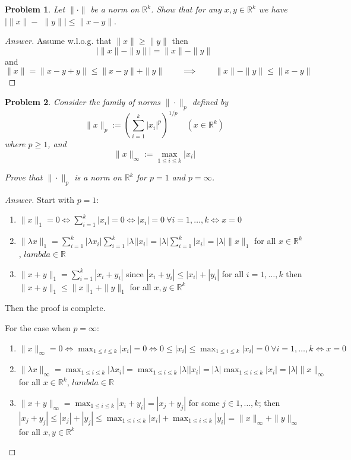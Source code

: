 \documentclass{article}
\newtheorem{problem}{Problem}[section]
\newcommand{\qiq}{\qquad \implies \qquad}
\begin{document}
\begin{problem}
    Let $\|\cdot\|$ be a norm on $\mathbb{R}^{k}$. Show that for any $x, y \in \mathbb{R}^{k}$ we have $\mid\|x\|-$ $\|y\| \mid \leq\|x-y\| .$
\end{problem}
\begin{proof}[Answer]
    Assume w.l.o.g. that $\|x\| \geq \|y\|$ then
    $$\big |\|x\|-\|y\|\big| = \|x\|-\|y\|$$
    and 
    $$\|x\| = \|x-y + y \| \leq \|x-y\| + \|y\| \qiq \|x\| - \|y\| \leq \|x-y\|$$
\end{proof}

\begin{problem}
    Consider the family of norms $\|\cdot\|_{p}$ defined by
$$
\|x\|_{p}:=\left(\sum_{i=1}^{k}\left|x_{i}\right|^{p}\right)^{1 / p} \quad\left(x \in \mathbb{R}^{k}\right)
$$
where $p \geq 1$, and 
$$\|x\|_{\infty}:=\max _{1 \leq i \leq k}\left|x_{i}\right|$$

Prove that $\|\cdot\|_{p}$ is a norm on $\mathbb{R}^{k}$ for $p=1$ and $p=\infty$.
\end{problem}
\begin{proof}[Answer]
    Start with $p=1$:
    \begin{enumerate}
        \item $\|x\|_1=0 \iff \sum_{i=1}^{k}\left|x_{i}\right| = 0 \iff |x_i| = 0 \: \forall i=1,\ldots,k \iff  x = 0$
        \item $\|\lambda x\|_1 = \sum_{i=1}^{k}\left|\lambda x_{i}\right| \sum_{i=1}^{k}|\lambda|\left|x_{i}\right| = |\lambda|\sum_{i=1}^{k}\left|x_{i}\right| = |\lambda| \|x\|_1$ for all $x\in \mathbb{R}^k$, $lambda\in \mathbb{R}$
        \item $\|x + y\|_1 = \sum_{i=1}^{k}\left|x_{i} + y_i\right|$ since $|x_i + y_i|\leq |x_i| + |y_i|$ for all $i=1,\ldots, k$ then $\|x + y\|_1\leq \|x \|_1 + \| y\|_1$ for all $x,y\in \mathbb{R}^k$
    \end{enumerate}
    Then the proof is complete.

    For the case when $p=\infty$:
    \begin{enumerate}
        \item $\|x\|_\infty=0 \iff \max _{1 \leq i \leq k}\left|x_{i}\right| = 0 \iff 0 \leq \left|x_{i}\right| \leq  \max _{1 \leq i \leq k}\left|x_{i}\right|  = 0 \:  \forall i=1,\ldots,k \iff  x = 0$ 
        \item $\|\lambda x\|_\infty = \max _{1 \leq i \leq k}\left|\lambda x_{i}\right| =\max _{1 \leq i \leq k}\left|\lambda| |x_{i}\right| = |\lambda| \max _{1 \leq i \leq k}\left|x_{i}\right| = |\lambda| \|x\|_\infty$ for all $x\in \mathbb{R}^k$, $lambda\in \mathbb{R}$
        \item $\| x + y\|_\infty = \max _{1 \leq i \leq k}\left|x_{i} + y_{i}\right|=\left|x_{j} + y_{j}\right|$ for some $j\in 1,\ldots , k$; then
              $\left|x_{j} + y_{j}\right| \leq |x_j| + |y_j| \leq \max _{1 \leq i \leq k}\left|x_{i}\right| + \max _{1 \leq i \leq k}\left|y_{i}\right| = \|x\|_\infty+\|y\|_\infty$  for all $x,y\in \mathbb{R}^k$
    \end{enumerate}
\end{proof}
\end{document}
